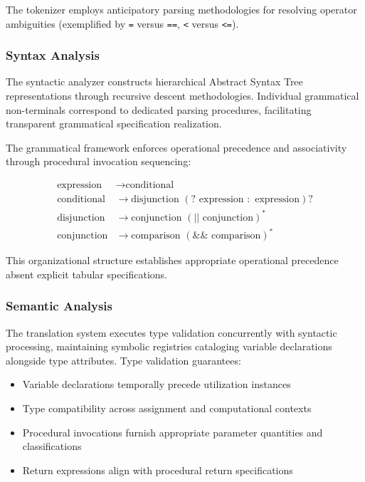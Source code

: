 \documentclass[conference,10pt,twocolumn]{IEEEtran}
\begin{document}
The tokenizer employs anticipatory parsing methodologies for resolving operator ambiguities (exemplified by \texttt{=} versus \texttt{==}, \texttt{<} versus \texttt{<=}).

\subsubsection{Syntax Analysis}

The syntactic analyzer constructs hierarchical Abstract Syntax Tree representations through recursive descent methodologies. Individual grammatical non-terminals correspond to dedicated parsing procedures, facilitating transparent grammatical specification realization.

The grammatical framework enforces operational precedence and associativity through procedural invocation sequencing:

\begin{equation}
\begin{aligned}
\text{expression} &\rightarrow \text{conditional} \\
\text{conditional} &\rightarrow \text{disjunction } (? \text{ expression } : \text{ expression})? \\
\text{disjunction} &\rightarrow \text{conjunction } (|| \text{ conjunction})^* \\
\text{conjunction} &\rightarrow \text{comparison } (\&\& \text{ comparison})^*
\end{aligned}
\end{equation}

This organizational structure establishes appropriate operational precedence absent explicit tabular specifications.

\subsubsection{Semantic Analysis}

The translation system executes type validation concurrently with syntactic processing, maintaining symbolic registries cataloging variable declarations alongside type attributes. Type validation guarantees:

\begin{itemize}
\item Variable declarations temporally precede utilization instances
\item Type compatibility across assignment and computational contexts
\item Procedural invocations furnish appropriate parameter quantities and classifications
\item Return expressions align with procedural return specifications
\end{itemize}
\end{document}
